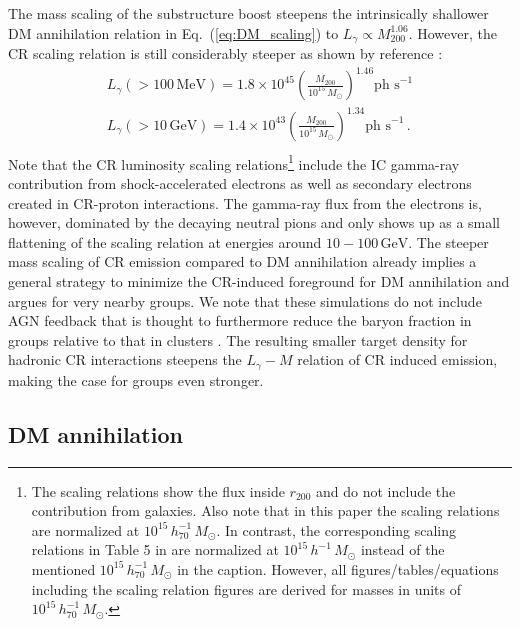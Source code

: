 \documentclass[10pt,aps,pra,reprint,amsmath,amsfonts,amssymb,showpacs,nofootinbib,floatfix]{revtex4-1}
\newcommand{\rmn}{\mathrm}
\newcommand{\msun}{M_\odot}
\newcommand{\mev}{\rmn{MeV}}
\newcommand{\gev}{\rmn{GeV}}
\newcommand{\rvir}{r_{200}}
\newcommand{\mvir}{M_{200}}
\begin{document}
The mass scaling of the substructure boost steepens the intrinsically
shallower DM annihilation relation in Eq.~(\ref{eq:DM_scaling}) to
$L_\gamma\propto \mvir^{1.06}$.  However, the CR scaling relation is
still considerably steeper as shown by reference
  \cite{2010MNRAS.409..449P}:
\begin{eqnarray}
L_{\gamma}(>100\,\mev) = 1.8\times10^{45}
\left(\frac{\mvir}{10^{15}\,\msun}\right)^{1.46}\mbox{ph~s}^{-1}\nonumber\\
L_{\gamma}(>10\,\gev)  = 1.4\times10^{43}
\left(\frac{\mvir}{10^{15}\,\msun}\right)^{1.34}\mbox{ph~s}^{-1}\,.\nonumber\\
\end{eqnarray}
Note that the CR luminosity scaling relations\footnote{The scaling
  relations show the flux inside $\rvir$ and do not include the
  contribution from galaxies. Also note that in this paper the scaling
  relations are normalized at $10^{15}\,h_{70}^{-1}\,\msun$. In
  contrast, the corresponding scaling relations in Table 5 in
  \cite{2010MNRAS.409..449P} are normalized at
  $10^{15}\,h^{-1}\,\msun$ instead of the mentioned
  $10^{15}\,h_{70}^{-1}\,\msun$ in the caption. However, all
  figures/tables/equations including the scaling relation figures are
  derived for masses in units of $10^{15}\,h_{70}^{-1}\,\msun$.}
include the IC gamma-ray contribution from shock-accelerated electrons
as well as secondary electrons created in CR-proton interactions. The
gamma-ray flux from the electrons is, however, dominated by the
decaying neutral pions and only shows up as a small flattening of the
scaling relation at energies around $10-100\,\gev$. The steeper mass
scaling of CR emission compared to DM annihilation already implies a
general strategy to minimize the CR-induced foreground for DM
annihilation and argues for very nearby groups. We note that these
simulations do not include AGN feedback that is thought to furthermore
reduce the baryon fraction in groups relative to that in clusters
\cite{2008ApJ...687L..53P}. The resulting smaller target density for
hadronic CR interactions steepens the $L_\gamma-M$ relation of CR
induced emission, making the case for groups even stronger.

\subsection{DM annihilation}
\end{document}
